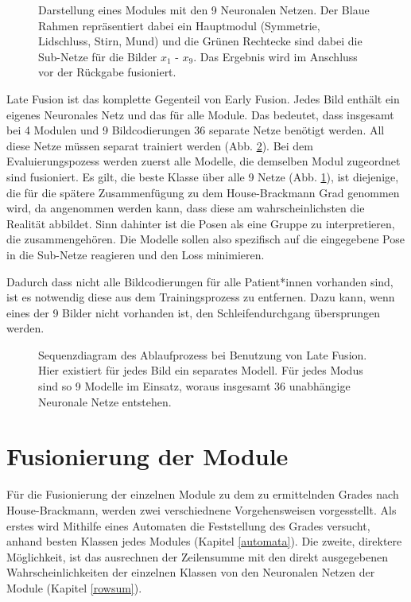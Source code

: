 \begin{figure}[b]
\begin{tikzpicture}[->,>=stealth',shorten >=1pt,auto,node distance=2.5cm,semithick]
\end{tikzpicture}
\caption[Darstellung eines Modules mit den 9 Neuronalen Netzen]{Darstellung eines Modules mit den 9 Neuronalen Netzen. Der Blaue Rahmen repräsentiert dabei ein Hauptmodul (Symmetrie, Lidschluss, Stirn, Mund) und die Grünen Rechtecke sind dabei die Sub-Netze für die Bilder $x_1$ - $x_9$. Das Ergebnis wird im Anschluss vor der Rückgabe fusioniert.}\label{cap:mod_lf}
\end{figure}\label{fig:mod_lf}


Late Fusion ist das komplette Gegenteil von Early Fusion. Jedes Bild enthält ein eigenes Neuronales Netz und das für alle Module. Das bedeutet, dass insgesamt bei 4 Modulen und 9 Bildcodierungen 36 separate Netze benötigt werden. All diese Netze müssen separat trainiert werden (Abb. \ref{cap:late}). Bei dem Evaluierungspozess werden zuerst alle Modelle, die demselben Modul zugeordnet sind fusioniert. Es gilt, die beste Klasse über alle 9 Netze (Abb. \ref{cap:mod_lf}), ist diejenige, die für die spätere Zusammenfügung zu dem House-Brackmann Grad genommen wird, da angenommen werden kann, dass diese am wahrscheinlichsten die Realität abbildet. Sinn dahinter ist die Posen als eine Gruppe zu interpretieren, die zusammengehören. Die Modelle sollen also spezifisch auf die eingegebene Pose in die Sub-Netze reagieren und den Loss minimieren.

Dadurch dass nicht alle Bildcodierungen für alle Patient*innen vorhanden sind, ist es notwendig diese aus dem Trainingsprozess zu entfernen. Dazu kann, wenn eines der 9 Bilder nicht vorhanden ist, den Schleifendurchgang übersprungen werden.



\begin{figure}[!t]\centering
\makebox[0pt]{}
\caption[Sequenzdiagram des Ablaufprozess bei Benutzung von Late Fusion]{Sequenzdiagram des Ablaufprozess bei Benutzung von Late Fusion. Hier existiert für jedes Bild ein separates Modell. Für jedes Modus sind so 9 Modelle im Einsatz, woraus insgesamt 36 unabhängige Neuronale Netze entstehen.}\label{cap:late}
\end{figure}\label{fig:late}





\clearpage
\section{Fusionierung der Module}\label{fusion}
Für die Fusionierung der einzelnen Module zu dem zu ermittelnden Grades nach House-Brackmann, werden zwei verschiednene Vorgehensweisen vorgesstellt. Als erstes wird Mithilfe eines Automaten die Feststellung des Grades versucht, anhand besten Klassen jedes Modules (Kapitel \ref{automata}). Die zweite, direktere Möglichkeit, ist das ausrechnen der Zeilensumme mit den direkt ausgegebenen Wahrscheinlichkeiten der einzelnen Klassen von den Neuronalen Netzen der Module (Kapitel \ref{rowsum}).

